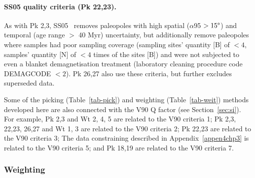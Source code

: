 \paragraph{SS05 quality criteria (Pk 22,23).}\label{subp:ss05} As with Pk 2,3,
SS05~\citep{S05} removes paleopoles with high spatial ($\alpha$95 $>15\degree$)
and temporal (age range $>$ 40 Myr) uncertainty, but additionally remove
paleopoles where samples had poor sampling coverage (sampling sites' quantity
[B] of $<4$, samples' quantity [N] of $<4$ times of the sites [B]) and were not
subjected to even a blanket demagnetisation treatment (laboratory cleaning
procedure code DEMAGCODE $<2$). Pk 26,27 also use these criteria, but
further excludes superseded data.

\bigskip
Some of the picking (Table~\ref{tab-pick}) and weighting (Table~\ref{tab-weit})
methods developed here are also connected with the V90 Q factor (see
Section~\ref{sec:si}). For example, Pk 2,3 and Wt 2, 4, 5 are related to the V90
criteria 1; Pk 2,3, 22,23, 26,27 and Wt 1, 3 are related to the V90 criteria 2;
Pk 22,23 are related to the V90 criteria 3; The data constraining described in
Appendix~\ref{appen4chp3} is related to the V90 criteria 5; and Pk 18,19 are
related to the V90 criteria 7.

\subsubsection{Weighting}\label{sec:w}

